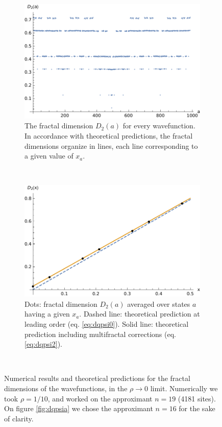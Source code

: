 \documentclass[11pt]{article}
\begin{document}
\begin{figure}[htp]

\centering
\begin{subfigure}{.5\textwidth}
  \centering
  \includegraphics[width=1.\textwidth]{img/local_dim_wf.pdf}
  \caption{The fractal dimension $D_2(a)$ for every wavefunction. In accordance with theoretical predictions, the fractal dimensions organize in lines, each line corresponding to a given value of $x_a$.}
  \label{fig:dqpsia}
\end{subfigure}%
~
\begin{subfigure}{.5\textwidth}
  \centering
  \includegraphics[width=1.\textwidth]{img/local_wf.pdf}
  \caption{Dots: fractal dimension $D_2(a)$ averaged over states $a$ having a given $x_a$. Dashed line: theoretical prediction at leading order (eq. \eqref{eq:dqpsi0}). Solid line: theoretical prediction including multifractal corrections (eq. \eqref{eq:dqpsi2}).}
  \label{fig:dqpsix}
\end{subfigure} \\

\caption{Numerical results and theoretical predictions for the fractal dimensions of the wavefunctions, in the $\rho \rightarrow 0$ limit. Numerically we took $\rho = 1/10$, and worked on the approximant $n=19$ (4181 sites). On figure \eqref{fig:dqpsia} we chose the approximant $n = 16$ for the sake of clarity.}
\label{fig:dqpsi}
\end{figure}
\end{document}
